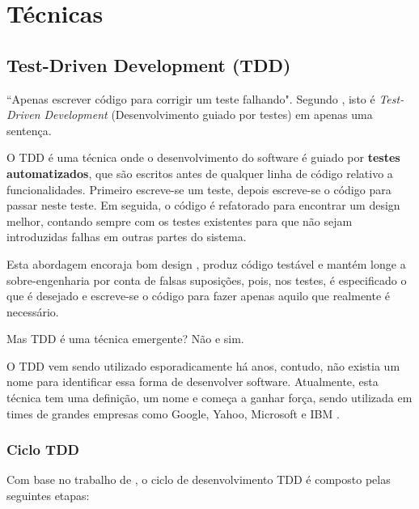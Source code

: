 \chapter{Técnicas}

\section{Test-Driven Development (TDD)}
\label{sub:tdd}
``Apenas escrever código para corrigir um teste falhando". Segundo , isto é \textit{Test-Driven Development} (Desenvolvimento guiado por testes) \cite{TDDbyExample} em apenas uma sentença.

O TDD é uma técnica onde o desenvolvimento do software é guiado por \textbf{testes automatizados}, que são escritos antes de qualquer linha de código relativo a funcionalidades. Primeiro escreve-se um teste, depois escreve-se o código para passar neste teste. Em seguida, o código é refatorado para encontrar um design melhor, contando sempre com os testes existentes para que não sejam introduzidas falhas em outras partes do sistema.

Esta abordagem encoraja bom design \cite{GrowingOOByTests}, produz código testável e mantém longe a sobre-engenharia por conta de falsas suposições, pois, nos testes, é especificado o que é desejado e escreve-se o código para fazer apenas aquilo que realmente é necessário. \cite{TestDrivenKoskela, TDDbyExample, EmpiricalTDD}

Mas TDD é uma técnica emergente? Não e sim.

O TDD vem sendo utilizado esporadicamente há anos, contudo, não existia um nome para identificar essa forma de desenvolver software. Atualmente, esta técnica tem uma definição, um nome e começa a ganhar força, sendo utilizada em times de grandes empresas como Google, Yahoo, Microsoft e IBM \cite{EmpiricalTDD}.

\subsection{Ciclo TDD}
\label{ssub:ciclo_tdd}

Com base no trabalho de , o ciclo de desenvolvimento TDD é composto pelas seguintes etapas:

